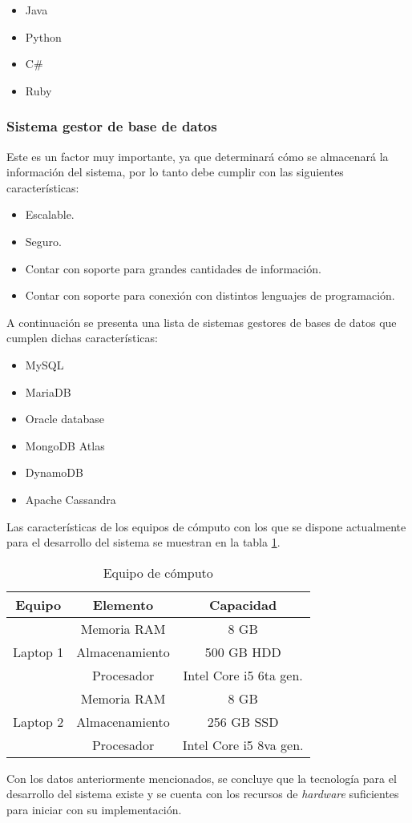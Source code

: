 \begin{itemize}
    \item Java
    \item Python
    \item C\#
    \item Ruby
\end{itemize}

\subsubsection{Sistema gestor de base de datos}

Este es un factor muy importante, ya que determinará cómo se almacenará la información del sistema, por lo tanto debe cumplir con las siguientes características:

\begin{itemize}
    \item Escalable.
    \item Seguro.
    \item Contar con soporte para grandes cantidades de información.
    \item Contar con soporte para conexión con distintos lenguajes de programación.
\end{itemize}


A continuación se presenta una lista de sistemas gestores de bases de datos que cumplen dichas características:

\begin{itemize}
    \item MySQL
    \item MariaDB
    \item Oracle database
    \item MongoDB Atlas
    \item DynamoDB
    \item Apache Cassandra
\end{itemize}

Las características de los equipos de cómputo con los que se dispone actualmente para el desarrollo del sistema se muestran en la tabla \ref{tab:hw_devices}.

\begin{table}
    \begin{tabular}{|c|c|c|}
        \hline
        Equipo & Elemento & Capacidad \\ \hline
        \multirow{3}{*}{Laptop 1} & Memoria RAM & 8 GB \\
        & Almacenamiento & 500 GB HDD \\
        & Procesador & Intel Core i5 6ta gen. \\ \hline
        \multirow{3}{*}{Laptop 2} & Memoria RAM & 8 GB \\
        & Almacenamiento & 256 GB SSD \\
        & Procesador & Intel Core i5 8va gen.\\ \hline
    \end{tabular}
    \caption{Equipo de cómputo}
    \label{tab:hw_devices}
\end{table}


Con los datos anteriormente mencionados, se concluye que la tecnología para el desarrollo del sistema existe y se cuenta con los recursos de \textit{hardware} suficientes para iniciar con su implementación.